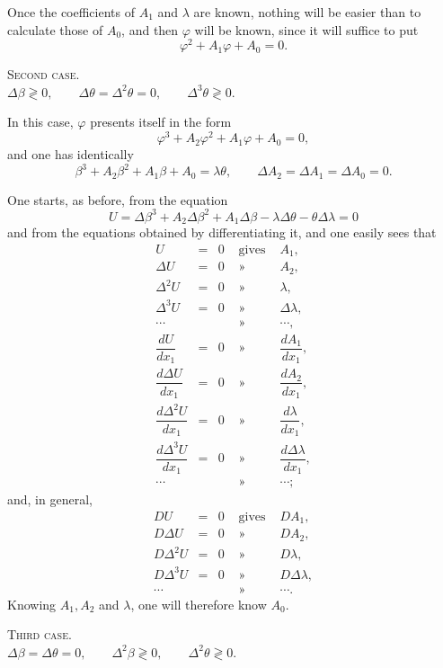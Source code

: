 \documentclass[11pt]{article}
\begin{document}
Once the coefficients of $A_1$ and $\lambda$ are known, nothing will be easier than to calculate those of $A_0$, and then $\varphi$ will be known, since it will suffice to put
\[
\varphi^2+A_1\varphi+A_0=0.
\]

\begin{center}
{\scshape Second case.}\\[0.3em]
$\Delta\beta\gtrless0,\qquad \Delta\theta=\Delta^2\theta=0,\qquad \Delta^3\theta\gtrless0.$
\end{center}

In this case, $\varphi$ presents itself in the form
\[
\varphi^3+A_2\varphi^2+A_1\varphi+A_0=0,
\]
and one has identically
\[
\beta^3+A_2\beta^2+A_1\beta+A_0=\lambda\theta,
\qquad
\Delta A_2=\Delta A_1=\Delta A_0=0.
\]

One starts, as before, from the equation
\[
U=\Delta\beta^3+A_2\Delta\beta^2+A_1\Delta\beta-\lambda\Delta\theta-\theta\Delta\lambda=0
\]
and from the equations obtained by differentiating it, and one easily sees that
\[
\begin{array}{rclcl}
U&=&0&\text{ gives }&A_1,\\
\Delta U&=&0&\text{ » }&A_2,\\
\Delta^2 U&=&0&\text{ » }&\lambda,\\
\Delta^3 U&=&0&\text{ » }&\Delta\lambda,\\
\cdots&&&\text{ » }&\cdots,\\[0.2em]
\dfrac{dU}{dx_1}&=&0&\text{ » }&\dfrac{dA_1}{dx_1},\\[0.2em]
\dfrac{d\Delta U}{dx_1}&=&0&\text{ » }&\dfrac{dA_2}{dx_1},\\[0.2em]
\dfrac{d\Delta^2 U}{dx_1}&=&0&\text{ » }&\dfrac{d\lambda}{dx_1},\\[0.2em]
\dfrac{d\Delta^3 U}{dx_1}&=&0&\text{ » }&\dfrac{d\Delta\lambda}{dx_1},\\
\cdots&&&\text{ » }&\cdots;
\end{array}
\]
and, in general,
\[
\begin{array}{rclcl}
DU&=&0&\text{ gives }&DA_1,\\
D\Delta U&=&0&\text{ » }&DA_2,\\
D\Delta^2 U&=&0&\text{ » }&D\lambda,\\
D\Delta^3 U&=&0&\text{ » }&D\Delta\lambda,\\
\cdots&&&\text{ » }&\cdots.
\end{array}
\]
Knowing $A_1,A_2$ and $\lambda$, one will therefore know $A_0$.

\begin{center}
{\scshape Third case.}\\[0.3em]
$\Delta\beta=\Delta\theta=0,\qquad \Delta^2\beta\gtrless0,\qquad \Delta^2\theta\gtrless0.$
\end{center}
\end{document}
